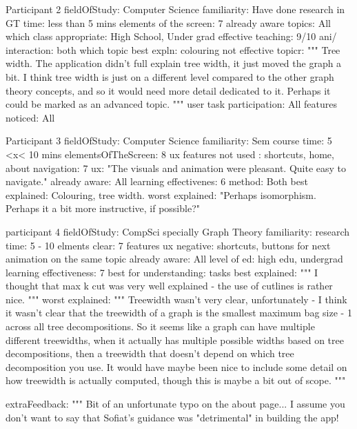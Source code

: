 Participant 2
   fieldOfStudy: Computer Science
   familiarity: Have done research in GT
   time: less than 5 mins
   elements of the screen: 7
   already aware topics: All
   which class appropriate: High School, Under grad
   effective teaching: 9/10
   ani/ interaction: both
   which topic best expln:  colouring
   not effective topicr:
      """ 
      Tree width. The application didn't full explain tree width, it just
      moved the graph a bit. I think tree width is just on a different level
      compared to the other graph theory concepts, and so it would need more
      detail dedicated to it. Perhaps it could be marked as an advanced topic.
      """
   user task participation: All
   features noticed: All

Participant 3
   fieldOfStudy: Computer Science
   familiarity: Sem course
   time: 5 <x< 10 mins
   elementsOfTheScreen: 8
   ux features not used :  shortcuts, home, about
   navigation: 7
   ux: "The visuals and animation were pleasant. Quite easy to navigate." 
   already aware: All
   learning effectivenes: 6
   method: Both
   best explained: Colouring, tree width.
   worst explained: "Perhaps isomorphism. Perhaps it a bit more instructive, if possible?"

participant 4
   fieldOfStudy: CompSci specially Graph Theory
   familiarity: research
   time: 5 - 10
   elments clear: 7
   features ux negative: shortcuts, buttons for next animation on the same topic
   already aware: All
   level of ed: high edu, undergrad
   learning effectiveness: 7
   best for understanding: tasks
   best explained:
      """
      I thought that max k cut was very well explained - the use of cutlines is rather nice.
      """
   worst explained:
      """
      Treewidth wasn't very clear, unfortunately - I think it wasn't clear that
      the treewidth of a graph is the smallest maximum bag size - 1 across all
      tree decompositions. So it seems like a graph can have multiple different
      treewidths, when it actually has multiple possible widths based on tree
      decompositions, then a treewidth that doesn't depend on which tree
      decomposition you use. It would have maybe been nice to include some
      detail on how treewidth is actually computed, though this is maybe a bit
      out of scope.  
      """

   extraFeedback:
      """ 
      Bit of an unfortunate typo on the about page... I assume you don't
      want to say that Sofiat's guidance was "detrimental" in building the app!

